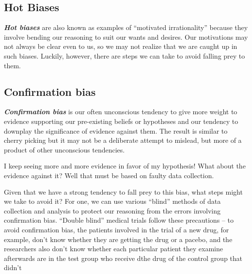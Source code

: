 \documentclass[12pt, openany]{book}
\begin{document}
\hypertarget{hot-biases}{%
\subsection*{\texorpdfstring{\textbf{Hot Biases}}{Hot Biases}}\label{hot-biases}}


\textbf{\emph{Hot biases}} are also known as examples of ``motivated irrationality'' because they involve bending our reasoning to suit our wants and desires. Our motivations may not always be clear even to us, so we may not realize that we are caught up in such biases. Luckily, however, there are steps we can take to avoid falling prey to them.

\hypertarget{confirmation-bias}{%
\subsection*{Confirmation bias}\label{confirmation-bias}}


\textbf{\emph{Confirmation bias}} is our often unconscious tendency to give more weight to evidence supporting our pre-existing beliefs or hypotheses and our tendency to downplay the significance of evidence against them. The result is similar to cherry picking but it may not be a deliberate attempt to mislead, but more of a product of other unconscious tendencies.

\begin{center}

\begin{argument}

I keep seeing more and more evidence in favor of my hypothesis! What about the evidence against it? Well that must be based on faulty data collection.

\end{argument}

\end{center}

Given that we have a strong tendency to fall prey to this bias, what steps might we take to avoid it? For one, we can use various ``blind'' methods of data collection and analysis to protect our reasoning from the errors involving confirmation bias. ``Double blind'' medical trials follow these precautions -- to avoid confirmation bias, the patients involved in the trial of a new drug, for example, don't know whether they are getting the drug or a pacebo, and the researchers also don't know whether each particular patient they examine afterwards are in the test group who receive dthe drug of the control group that didn't
\end{document}
